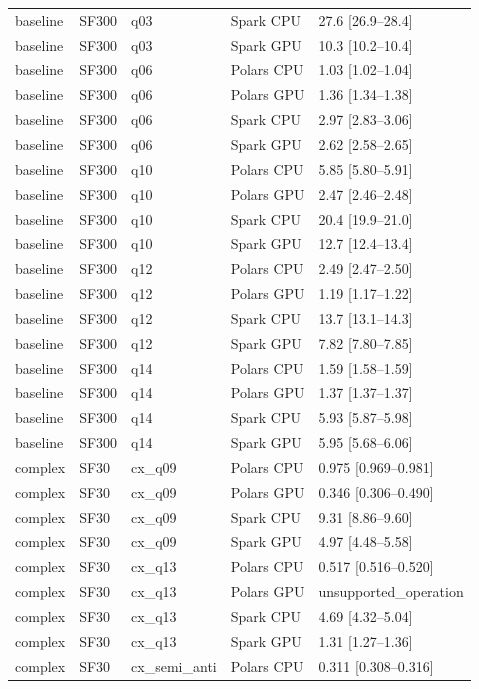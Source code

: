\begin{longtable}{lllll}
baseline & SF300 & q03 & Spark CPU & 27.6 [26.9--28.4] \\
baseline & SF300 & q03 & Spark GPU & 10.3 [10.2--10.4] \\
baseline & SF300 & q06 & Polars CPU & 1.03 [1.02--1.04] \\
baseline & SF300 & q06 & Polars GPU & 1.36 [1.34--1.38] \\
baseline & SF300 & q06 & Spark CPU & 2.97 [2.83--3.06] \\
baseline & SF300 & q06 & Spark GPU & 2.62 [2.58--2.65] \\
baseline & SF300 & q10 & Polars CPU & 5.85 [5.80--5.91] \\
baseline & SF300 & q10 & Polars GPU & 2.47 [2.46--2.48] \\
baseline & SF300 & q10 & Spark CPU & 20.4 [19.9--21.0] \\
baseline & SF300 & q10 & Spark GPU & 12.7 [12.4--13.4] \\
baseline & SF300 & q12 & Polars CPU & 2.49 [2.47--2.50] \\
baseline & SF300 & q12 & Polars GPU & 1.19 [1.17--1.22] \\
baseline & SF300 & q12 & Spark CPU & 13.7 [13.1--14.3] \\
baseline & SF300 & q12 & Spark GPU & 7.82 [7.80--7.85] \\
baseline & SF300 & q14 & Polars CPU & 1.59 [1.58--1.59] \\
baseline & SF300 & q14 & Polars GPU & 1.37 [1.37--1.37] \\
baseline & SF300 & q14 & Spark CPU & 5.93 [5.87--5.98] \\
baseline & SF300 & q14 & Spark GPU & 5.95 [5.68--6.06] \\
complex & SF30 & cx\_q09 & Polars CPU & 0.975 [0.969--0.981] \\
complex & SF30 & cx\_q09 & Polars GPU & 0.346 [0.306--0.490] \\
complex & SF30 & cx\_q09 & Spark CPU & 9.31 [8.86--9.60] \\
complex & SF30 & cx\_q09 & Spark GPU & 4.97 [4.48--5.58] \\
complex & SF30 & cx\_q13 & Polars CPU & 0.517 [0.516--0.520] \\
complex & SF30 & cx\_q13 & Polars GPU & unsupported\_operation \\
complex & SF30 & cx\_q13 & Spark CPU & 4.69 [4.32--5.04] \\
complex & SF30 & cx\_q13 & Spark GPU & 1.31 [1.27--1.36] \\
complex & SF30 & cx\_semi\_anti & Polars CPU & 0.311 [0.308--0.316] \\

\end{longtable}
